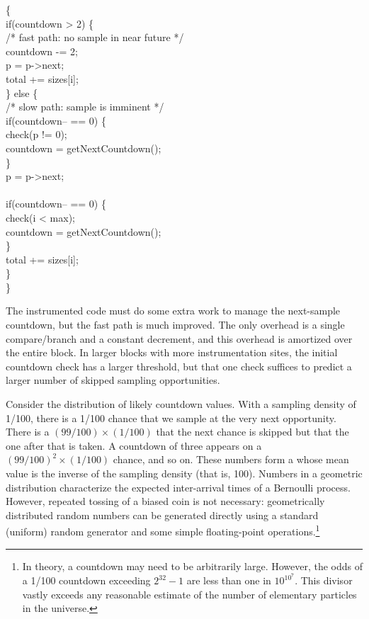 \begin{code}
  \{\+ \\
  if(countdown > 2) \{ \\
  \> /* fast path: no sample in near future */ \\
  \> countdown -= 2; \\
  \> \up p = p->next; \\
  \> \up total += sizes[i]; \\
  \} else \{ \\
  \> /* slow path: sample is imminent */ \\
  \> if(countdown-- == 0) \{ \\
  \>\> check(p != 0); \\
  \>\> countdown = getNextCountdown(); \\
  \> \} \\
  \> \up p = p->next; \\
  \> \\
  \> if(countdown-- == 0) \{ \\
  \>\> check(i < max); \\
  \>\> countdown = getNextCountdown(); \\
  \> \} \\
  \> \up total += sizes[i]; \\
  \} \\
  \<\}
\end{code}

The instrumented code must do some extra work to manage the
next-sample countdown, but the fast path is much improved.  The only
overhead is a single compare/branch and a constant decrement, and this
overhead is amortized over the entire block.  In larger blocks with
more instrumentation sites, the initial countdown check has a
larger threshold, but that one check suffices to predict a larger
number of skipped sampling opportunities.

Consider the distribution of likely countdown values.  With a sampling
density of 1/100, there is a 1/100 chance that we sample at the
very next opportunity.  There is a $(99/100) \times (1/100)$ that the
next chance is skipped but that the one after that is taken.
A countdown of three appears on a $(99/100)^2 \times (1/100)$ chance,
and so on.  These numbers form a 
whose mean value is the inverse of the sampling density (that is,
100).  Numbers in a geometric distribution characterize the expected
inter-arrival times of a Bernoulli process.  However, repeated tossing
of a biased coin is not necessary: geometrically distributed random
numbers can be generated directly using a standard (uniform) random
generator and some simple floating-point operations.\footnote{In
  theory, a countdown may need to be arbitrarily large.  However, the
  odds of a 1/100 countdown exceeding $2^{32}-1$ are less than one in
  $10^{10^7}$.  This divisor vastly exceeds any reasonable estimate of
  the number of elementary particles in the universe.}

